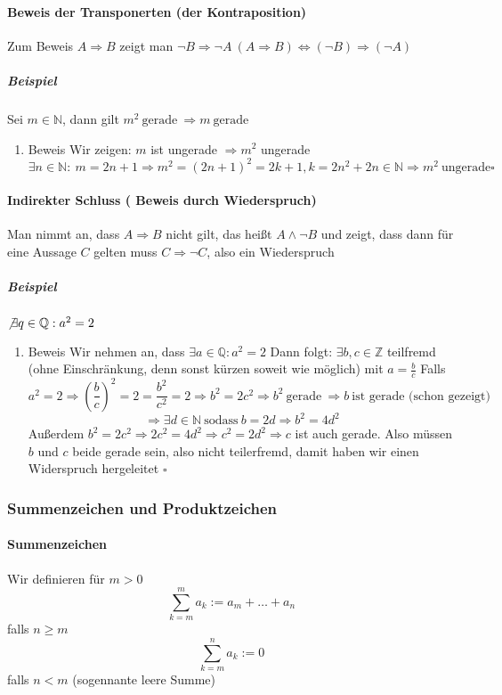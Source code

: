 \documentclass[a4paper]{scrartcl}
\begin{document}
\paragraph{Beweis der Transponerten (der Kontraposition)}
\label{sec-2-1-3-2}
Zum Beweis $A\Rightarrow B$ zeigt man $\neg B\Rightarrow \neg A~(A\Rightarrow B)\Leftrightarrow (\neg B) \Rightarrow (\neg A)$
\subparagraph{Beispiel}
\label{sec-2-1-3-2-1}
Sei $m\in\mathbb{N}$, dann gilt $m^2~\text{gerade}~\Rightarrow m~\text{gerade}$
\begin{enumerate}
\item Beweis
\label{sec-2-1-3-2-1-1}
Wir zeigen: $m$ ist ungerade $\Rightarrow m^2$ ungerade
\[\exists n\in\mathbb{N}:~m=2n+1\Rightarrow m^2 = (2n+1)^2 = 2k+1, k=2n^2 + 2n\in\mathbb{N}\Rightarrow m^2~\text{ungerade} \square\]
\end{enumerate}
\paragraph{Indirekter Schluss ( Beweis durch Wiederspruch)}
\label{sec-2-1-3-3}
Man nimmt an, dass $A\Rightarrow B$ nicht gilt, das heißt $A \wedge \neg B$ und zeigt, dass dann für eine Aussage $C$ gelten muss $C\Rightarrow \neg C$, also ein Wiederspruch
\subparagraph{Beispiel}
\label{sec-2-1-3-3-1}
$\not\exists q\in\mathbb{Q}: a^2 = 2$
\begin{enumerate}
\item Beweis
\label{sec-2-1-3-3-1-1}
Wir nehmen an, dass $\exists a\in\mathbb{Q}: a^2=2$ Dann folgt:
$\exists b,c\in\mathbb{Z}$ teilfremd (ohne Einschränkung, denn sonst kürzen soweit wie möglich) mit $a=\frac{b}{c}$
Falls \[a^2=2\Rightarrow (\frac{b}{c})^2=2=\frac{b^2}{c^2}=2 \Rightarrow b^2 = 2c^2 \Rightarrow b^2~\text{gerade}~\Rightarrow b~\text{ist gerade (schon gezeigt)}\] \[\Rightarrow\exists d\in\mathbb{N}~\text{sodass}~b=2d\Rightarrow b^2=4d^2\]
Außerdem $b^2=2c^2\Rightarrow 2c^2=4d^2\Rightarrow c^2=2d^2\Rightarrow c$ ist auch gerade. Also müssen $b$ und $c$ beide gerade sein, also nicht teilerfremd, damit haben wir einen Widerspruch hergeleitet $\square$
\end{enumerate}
\subsubsection{Summenzeichen und Produktzeichen}
\label{sec-2-1-4}
\paragraph{Summenzeichen}
\label{sec-2-1-4-1}
Wir definieren für $m > 0$ \[\sum_{k=m}^m a_k := a_m + \ldots + a_n\] falls $n\geq m$
\[\sum_{k=m}^n a_k := 0\] falls $n < m$ (sogennante leere Summe)
\end{document}
